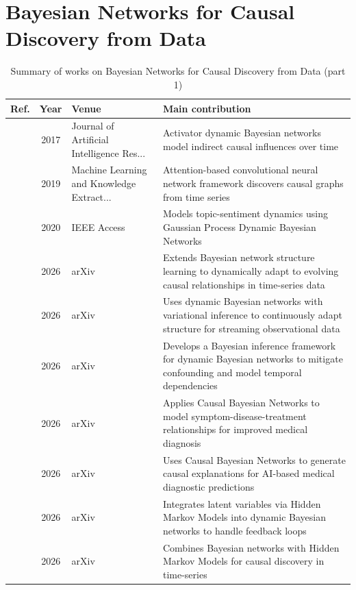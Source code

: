 \section{Bayesian Networks for Causal Discovery from Data}\label{sec:theme0}
\begin{table}[!t]
\centering
\renewcommand{\arraystretch}{1.2}
\caption{Summary of works on Bayesian Networks for Causal Discovery from Data (part 1)}\label{tab:theme0}
\begin{tabularx}{\textwidth}{@{}l c p{3.6cm} X@{}}
\toprule
\textbf{Ref.} & \textbf{Year} & \textbf{Venue} & \textbf{Main contribution} \\
\midrule
\cite{motzek2017indirect} & 2017 & Journal of Artificial Intelligence Res... & Activator dynamic Bayesian networks model indirect causal influences over time \\
\cite{nauta2019causal} & 2019 & Machine Learning and Knowledge Extract... & Attention-based convolutional neural network framework discovers causal graphs from time series \\
\cite{liang2020dynamic} & 2020 & IEEE Access & Models topic-sentiment dynamics using Gaussian Process Dynamic Bayesian Networks \\
\cite{zhang2026causal} & 2026 & arXiv & Extends Bayesian network structure learning to dynamically adapt to evolving causal relationships in time-series data \\
\cite{zhang2026causalb} & 2026 & arXiv & Uses dynamic Bayesian networks with variational inference to continuously adapt structure for streaming observational data \\
\cite{zhang2026causalc} & 2026 & arXiv & Develops a Bayesian inference framework for dynamic Bayesian networks to mitigate confounding and model temporal dependencies \\
\cite{zhang2026causald} & 2026 & arXiv & Applies Causal Bayesian Networks to model symptom-disease-treatment relationships for improved medical diagnosis \\
\cite{zhang2026explainable} & 2026 & arXiv & Uses Causal Bayesian Networks to generate causal explanations for AI-based medical diagnostic predictions \\
\cite{zhang2026causale} & 2026 & arXiv & Integrates latent variables via Hidden Markov Models into dynamic Bayesian networks to handle feedback loops \\
\cite{zhang2026causalf} & 2026 & arXiv & Combines Bayesian networks with Hidden Markov Models for causal discovery in time-series \\

\end{tabularx}
\end{table}
